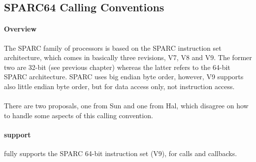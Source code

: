 %
%
%
%

\subsection{SPARC64 Calling Conventions}

\paragraph{Overview}

The SPARC family of processors is based on the SPARC instruction set architecture, which comes in basically three revisions,
V7, V8\cite{SPARCV8}\cite{SPARCSysV} and V9\cite{SPARCV9}\cite{SPARCV9SysV}. The former two are 32-bit (see previous chapter) whereas the latter refers to the 64-bit SPARC architecture.
SPARC uses big endian byte order, however, V9 supports also little endian byte order, but for data access only, not instruction access.\\
\\
There are two proposals, one from Sun and one from Hal, which disagree on how to handle some aspects of this calling convention.\\

\paragraph{ support}

 fully supports the SPARC 64-bit instruction set (V9), for calls and callbacks.

